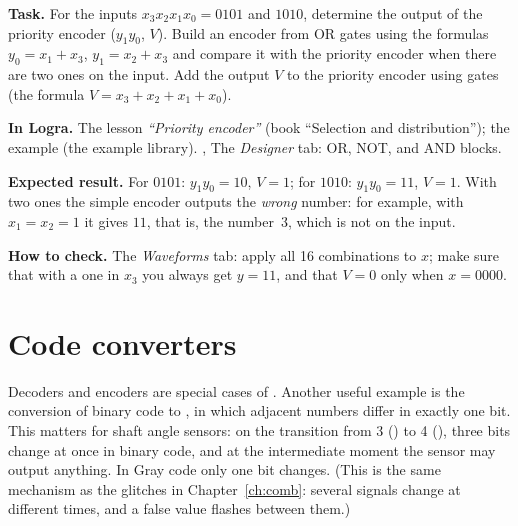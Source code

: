 \begin{diybox}
\textbf{Task.}  For the inputs $x_3x_2x_1x_0=0101$ and $1010$,
determine the output of the priority encoder ($y_1y_0$, $V$). 
Build an encoder from OR gates using the formulas $y_0=x_1+x_3$,
$y_1=x_2+x_3$ and compare it with the priority encoder when there are two ones on the input.
 Add the output $V$ to the priority encoder using gates
(the formula $V=x_3+x_2+x_1+x_0$).

\textbf{In Logra.}  The lesson \emph{``Priority encoder''} (book
``Selection and distribution''); the example  (the example library).
,  The \emph{Designer} tab: OR, NOT, and AND blocks.

\textbf{Expected result.} For $0101$: $y_1y_0=10$, $V=1$; for $1010$:
$y_1y_0=11$, $V=1$. With two ones the simple encoder outputs
the \emph{wrong} number: for example, with $x_1=x_2=1$ it gives $11$, that is,
the number~3, which is not on the input.

\textbf{How to check.} The \emph{Waveforms} tab: apply all
16 combinations to $x$; make sure that with a one in $x_3$ you always get $y=11$,
and that $V=0$ only when $x=0000$.
\end{diybox}

\section{Code converters}

Decoders and encoders are special cases of .
Another useful example is the conversion of binary code to , in
which adjacent numbers differ in exactly one bit. This matters for
shaft angle sensors: on the transition from 3 () to 4 (), three bits
change at once in binary code, and at the intermediate moment the sensor may output
anything. In Gray code only one bit changes. (This is the same
mechanism as the glitches in Chapter~\ref{ch:comb}: several signals change
at different times, and a false value flashes between them.)

